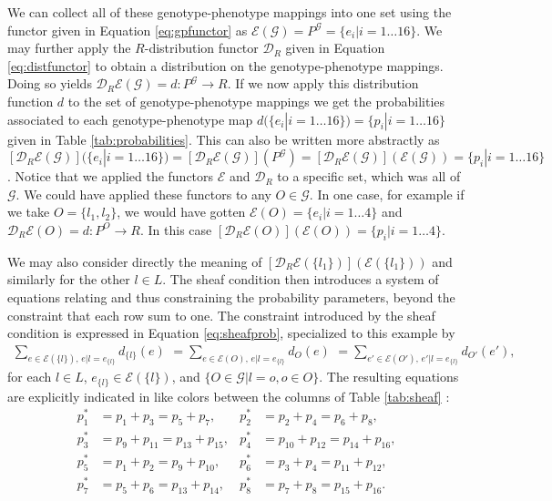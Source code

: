 We can collect all of these genotype-phenotype mappings into one set using the functor given in Equation \ref{eq:gpfunctor} as $\mathcal{E}(\mathcal{G}) = P^{\mathcal{G}} = \{e_i | i=1 \ldots 16 \}$. We may further apply the $R$-distribution functor $\mathcal{D}_R$ given in Equation \ref{eq:distfunctor} to obtain a distribution on the genotype-phenotype mappings. Doing so yields  $\mathcal{D}_R\mathcal{E}(\mathcal{G})=d \colon P^\mathcal{G} \rightarrow R$. If we now apply this distribution function $d$ to the set of genotype-phenotype mappings we get the probabilities associated to each genotype-phenotype map $d(\{e_i | i=1 \ldots 16 \}) = \{p_i|i=1 \ldots 16\}$ given in Table \ref{tab:probabilities}. This can also be written more abstractly as $\left[\mathcal{D}_R\mathcal{E}(\mathcal{G})\right](\{e_i | i=1 \ldots 16 \}) = \left[\mathcal{D}_R\mathcal{E}(\mathcal{G})\right](P^\mathcal{G}) = \left[\mathcal{D}_R\mathcal{E}(\mathcal{G})\right](\mathcal{E}(\mathcal{G})) = \{p_i|i=1 \ldots 16\}$. Notice that we applied the functors $\mathcal{E}$ and $\mathcal{D}_R$ to a specific set, which was all of $\mathcal{G}$. We could have applied these functors to any $O \in \mathcal{G}$. In one case, for example if we take $O = \{l_1, l_2\}$, we would have gotten $\mathcal{E}(O) = \{e_i|i=1 \ldots 4\}$ and $\mathcal{D}_R\mathcal{E}(O) = d \colon P^O \rightarrow R$. In this case $\left[\mathcal{D}_R\mathcal{E}(O)\right](\mathcal{E}(O)) = \{p_i|i=1 \ldots 4\}$.

We may also consider directly the meaning of $\left[\mathcal{D}_R\mathcal{E}(\{l_1\})\right](\mathcal{E}(\{l_1\}))$ and similarly for the other $l \in L$. The sheaf condition then introduces a system of equations relating and thus constraining the probability parameters, beyond the constraint that each row sum to one. The constraint introduced by the sheaf condition is expressed in Equation \ref{eq:sheafprob}, specialized to this example by
\begin{eqnarray}\label{eq:sheafprob2}
\sum_{e \in \mathcal{E}(\{l\}),\, e|l=e_{\{l\}}} d_{\{l\}}(e) \,\, = \sum_{e \in \mathcal{E}(O),\, e|l=e_{\{l\}}} d_O(e) \,\, = \sum_{e' \in \mathcal{E}(O'),\, e'|l=e_{\{l\}}} d_{O'}(e'),
\end{eqnarray}
for each $l \in L$, $e_{\{l\}} \in \mathcal{E}(\{l\})$, and $\{O \in \mathcal{G}|l=o, o \in O\}$. The resulting equations are explicitly indicated in like colors between the columns of Table \ref{tab:sheaf} :
\begin{equation}
\begin{aligned}\label{eq:pparsys}
p^*_1 &= p_1 + p_3 = p_5 + p_7, &
p^*_2 &= p_2 + p_4 = p_6 + p_8,\\
p^*_3 &= p_9 + p_{11} = p_{13} + p_{15},&
p^*_4 &= p_{10} + p_{12} = p_{14} + p_{16},\\
p^*_5 &= p_1 + p_2 = p_9 + p_{10},&
p^*_6 &= p_3 + p_4 = p_{11} + p_{12},\\
p^*_7 &= p_5 + p_6 = p_{13} + p_{14},&
p^*_8 &= p_7 + p_8 = p_{15} + p_{16}.
\end{aligned}
\end{equation}

